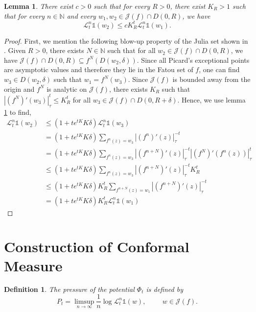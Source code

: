\documentclass[12pt,reqno]{amsart}
\newtheorem{lemma}[theorem]{Lemma}
\newtheorem{definition}[theorem]{Definition}
\begin{document}
\begin{lemma}\label{distortion of transfer operator}
    There exist $c>0$ such that for every $R>0$, there exist $K_R>1$ such that for every $n\in \mathbb{N}$ and every $w_1, w_2 \in \mathcal{J}(f)\cap D(0, R)$, we have
   $$\mathcal{L}_t^n\mathbb{1}(w_2) \leq c K_R^t\mathcal{L}_t^n\mathbb{1}(w_1).$$
\end{lemma}
\begin{proof}
    First, we mention the following blow-up property of the Julia set shown in \citep[p. 18]{Urbanski-Mayer}. Given $R>0$, there exists $N \in \mathbb{N}$ such that for all $w_2 \in \mathcal{J}(f)\cap D(0, R)$, we have $\mathcal{J}(f)\cap D(0, R) \subseteq f^N\left( D(w_2,\delta) \right)$. Since all Picard's exceptional points are asymptotic values and therefore they lie in the Fatou set of $f$, one can find $w_3 \in D(w_2, \delta)$ such that $w_1=f^N(w_3)$. Since $\mathcal{J}(f)$ is bounded away from the origin and $f^N$ is analytic on $\mathcal{J}(f)$, there exists $K_R$ such that $|(f^N)'(w_3)|^t_{\tau}\leq K_R^t$ for all $w_3 \in \mathcal{J}(f)\cap D(0, R+\delta)$. Hence, we use lemma \ref{distortion of transfer operator} to find,
    \begin{align*}
        \mathcal{L}_t^n\mathbb{1}(w_2) &\leq (1+te^{tK}K\delta)\mathcal{L}_t^n\mathbb{1}(w_3) \\
        & = (1+te^{tK}K\delta) \sum_{f^n(z)=w_3} \left|(f^{n})'(z)\right|_{\tau}^{-t}\\
        & = (1+te^{tK}K\delta) \sum_{f^{n}(z)=w_3} \left|(f^{n+N})'(z)\right|_{\tau}^{-t}\left|(f^{N})'(f^n(z))\right|_{\tau}^{t} \\
        & \leq (1+te^{tK}K\delta) \sum_{f^{n}(z)=w_3} \left|(f^{n+N})'(z)\right|_{\tau}^{-t}K_R^t\\
        & \leq (1+te^{tK}K\delta)K_R^t \sum_{f^{n+N}(z)=w_1} \left|(f^{n+N})'(z)\right|_{\tau}^{-t}\\
        & = (1+te^{tK}K\delta)K_R^t \mathcal{L}_t^n\mathbb{1}(w_1)
    \end{align*}
\end{proof}
\section{Construction of Conformal Measure}
\begin{definition}\label{pressure}
    The pressure of the potential $\Phi_t$ is defined by 
    $$P_t= \limsup_{n \to \infty}\dfrac{1}{n}\log \mathcal{L}_t^n\mathbb{1}(w), \hspace{1cm} w \in \mathcal{J}(f).$$
\end{definition}
\end{document}

